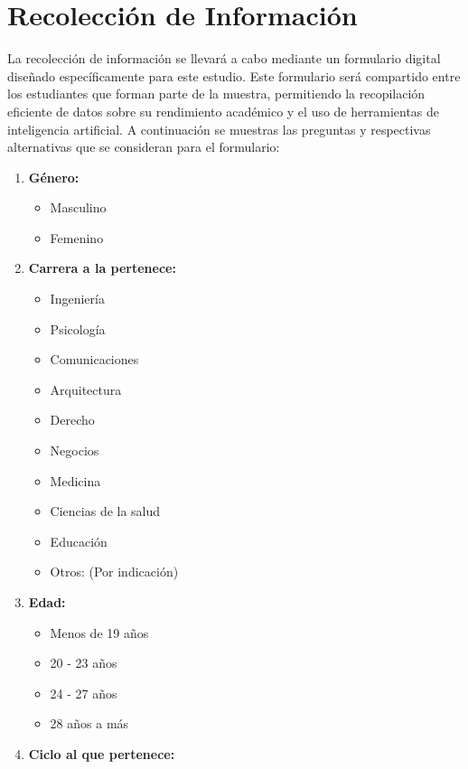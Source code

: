 \section{Recolección de Información}

  La recolección de información se llevará a cabo mediante un formulario digital diseñado específicamente para este estudio. Este formulario será compartido entre los estudiantes que forman parte de la muestra, permitiendo la recopilación eficiente de datos sobre su rendimiento académico y el uso de herramientas de inteligencia artificial. A continuación se muestras las preguntas y respectivas alternativas que se consideran para el formulario:
  
  \begin{multicols}{2}
    \raggedcolumns %
    \begin{enumerate}
      \item \textbf{Género:}
      \begin{itemize}
        \item Masculino
        \item Femenino
      \end{itemize}
      \item \textbf{Carrera a la pertenece:}
      \begin{itemize}
        \item Ingeniería
        \item Psicología
        \item Comunicaciones
        \item Arquitectura
        \item Derecho
        \item Negocios
        \item Medicina
        \item Ciencias de la salud
        \item Educación
        \item Otros: (Por indicación)
      \end{itemize}
      \item \textbf{Edad:}
      \begin{itemize}
        \item Menos de 19 años
        \item 20 - 23 años
        \item 24 - 27 años
        \item 28 años a más
      \end{itemize}
      \item \textbf{Ciclo al que pertenece:}

\end{enumerate}
\end{multicols}
